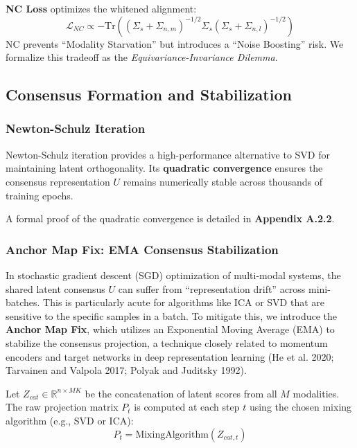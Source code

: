 \documentclass[
  letterpaper,
]{report}
\begin{document}
\textbf{NC Loss} optimizes the whitened alignment:
\[ \mathcal{L}_{NC} \propto - \text{Tr}\left( (\Sigma_s + \Sigma_{n,m})^{-1/2} \Sigma_s (\Sigma_s + \Sigma_{n,l})^{-1/2} \right) \]
NC prevents ``Modality Starvation'' but introduces a ``Noise Boosting''
risk. We formalize this tradeoff as the \emph{Equivariance-Invariance
Dilemma}.

\subsection{Consensus Formation and
Stabilization}\label{consensus-formation-and-stabilization}

\subsubsection{Newton-Schulz Iteration}\label{newton-schulz-iteration}

Newton-Schulz iteration provides a high-performance alternative to SVD
for maintaining latent orthogonality. Its \textbf{quadratic convergence}
ensures the consensus representation \(U\) remains numerically stable
across thousands of training epochs.

A formal proof of the quadratic convergence is detailed in
\textbf{Appendix A.2.2}.

\subsubsection{Anchor Map Fix: EMA Consensus
Stabilization}\label{anchor-map-fix-ema-consensus-stabilization}

In stochastic gradient descent (SGD) optimization of multi-modal
systems, the shared latent consensus \(U\) can suffer from
``representation drift'' across mini-batches. This is particularly acute
for algorithms like ICA or SVD that are sensitive to the specific
samples in a batch. To mitigate this, we introduce the \textbf{Anchor
Map Fix}, which utilizes an Exponential Moving Average (EMA) to
stabilize the consensus projection, a technique closely related to
momentum encoders and target networks in deep representation learning
(He et al. 2020; Tarvainen and Valpola 2017; Polyak and Juditsky 1992).

Let \(Z_{cat} \in \mathbb{R}^{n \times MK}\) be the concatenation of
latent scores from all \(M\) modalities. The raw projection matrix
\(P_t\) is computed at each step \(t\) using the chosen mixing algorithm
(e.g., SVD or ICA): \[ P_t = \text{MixingAlgorithm}(Z_{cat, t}) \]
\end{document}
